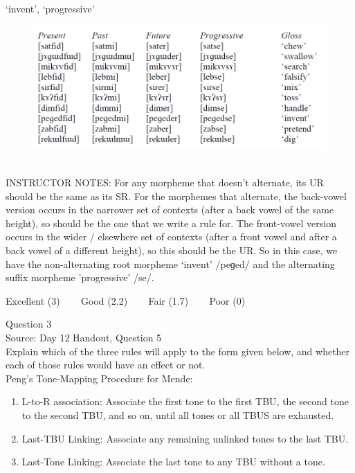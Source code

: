 \documentclass[12pt]{article}
\begin{document}
`invent', `progressive'

\begin{figure}[H]
\includegraphics{../images/final_dataset.png}
\end{figure}

~\\
INSTRUCTOR NOTES: For any morpheme that doesn’t alternate, its UR should be the same as its SR.  For the morphemes that alternate, the back-vowel version occurs in the narrower set of contexts (after a back vowel of the same height), so should be the one that we write a rule for. The front-vowel version occurs in the wider / elsewhere set of contexts (after a front vowel and after a back vowel of a different height), so this should be the UR. So in this case, we have the non-alternating root morpheme ‘invent’ /peɡed/ and the alternating suffix morpheme 'progressive' /se/.


\vfill
Excellent (3) ~~~ Good (2.2) ~~~ Fair (1.7) ~~~ Poor (0)
\newpage

{\large Question 3}\\

Source: Day 12 Handout, Question 5\\

Explain which of the three rules will apply to the form given below, and whether each of those rules would have an effect or not.\\

Peng’s Tone-Mapping Procedure for Mende: \begin{enumerate} \item L-to-R association: Associate the first tone to the first TBU, the second tone to the second TBU, and so on, until all tones or all TBUS are exhausted. \item Last-TBU Linking: Associate any remaining unlinked tones to the last TBU. \item Last-Tone Linking: Associate the last tone to any TBU without a tone. \end{enumerate}
\end{document}
